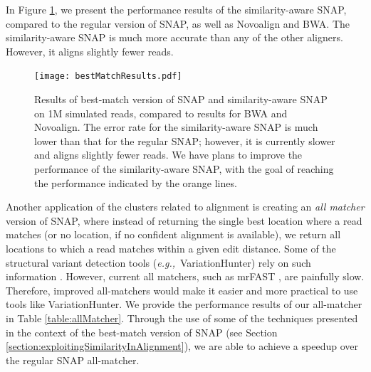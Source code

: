 \documentclass[twocolumn,10pt]{article}
\newcommand{\eg}{{\em e.g.,}~}
\begin{document}
In Figure \ref{fig:bestMatchResults}, we present the performance results of the similarity-aware SNAP, compared to the regular version of SNAP, as well as Novoalign and BWA.  The similarity-aware SNAP is much more accurate than any of the other aligners.  However, it aligns slightly fewer reads.  

\begin{figure}[!t]
\texttt{[image: bestMatchResults.pdf]}
\label{fig:bestMatchResults}
\caption{Results of best-match version of SNAP and similarity-aware SNAP on 1M simulated reads, compared to results for BWA and Novoalign.  The error rate for the similarity-aware SNAP is much lower than that for the regular SNAP; however, it is currently slower and aligns slightly fewer reads.  We have plans to improve the performance of the similarity-aware SNAP, with the goal of reaching the performance indicated by the orange lines.}
\end{figure}


Another application of the clusters related to alignment is creating an \textit{all matcher} version of SNAP, where instead of returning the single best location where a read matches (or no location, if no confident alignment is available), we return all locations to which a read matches within a given edit distance.  Some of the structural variant detection tools (\eg VariationHunter) rely on such information \cite{Hormozdiari:2009}.  However, current all matchers, such as mrFAST \cite{Alkan:2009}, are painfully slow.  %
Therefore, improved all-matchers would make it easier and more practical to use tools like VariationHunter.
We provide the performance results of our all-matcher in Table \ref{table:allMatcher}.  Through the use of some of the techniques presented in the context of the best-match version of SNAP (see Section \ref{section:exploitingSimilarityInAlignment}), we are able to achieve a speedup over the regular SNAP all-matcher.
\end{document}
